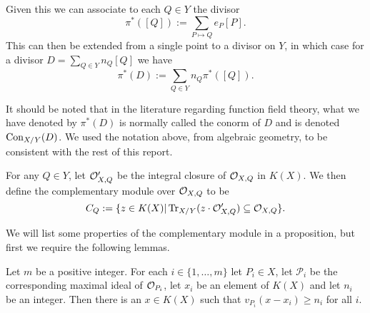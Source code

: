 Given this we can associate to each $Q\in Y$ the divisor
    \[
    \pi^*([Q]) := \sum_{P\mapsto Q} e_P [P].
    \]
This can then be extended from a single point to a divisor on $Y$, in which case for a divisor $D = \sum_{Q\in Y}n_Q [Q]$ we have
    \[
    \pi^*(D) := \sum_{Q\in Y}n_Q \pi^*([Q]).
    \]

    \begin{rem}
    It should be noted that in the literature regarding function field theory, what we have denoted by $\pi^*(D)$ is normally called the conorm of $D$ and is denoted ${\rm Con}_{X/Y}(D)$. 
    We used the notation above, from algebraic geometry, to be consistent with the rest of this report.
    \end{rem}

    \begin{defn}
    For any $Q\in Y$, let ${\cal O}_{X,Q}'$ be the integral closure of ${\cal O}_{X,Q}$ in $K(X)$.
    We then define the complementary module over ${\cal O}_{X,Q}$ to be
        \[
        C_Q :=\{z\in K(X) | \operatorname{Tr}_{X/Y}(z\cdot {\cal O}_{X,Q}') \subseteq {\cal O}_{X,Q}\}.
        \]
    \end{defn}


We will list some properties of the complementary module in a proposition, but first we require the following lemmas.

    \begin{lem}\label{approximationlemma}
    Let $m$ be a positive integer. 
    For each $i\in \{1,\ldots, m\}$ let $P_i\in X$, let $\mathcal{P}_i$ be the corresponding maximal ideal of ${\cal O}_{P_i}$, let $x_i$ be an element of $K(X)$ and let $n_i$ be an integer.
    Then there is an $x\in K(X)$ such that $v_{P_i}(x-x_i) \geq n_i$ for all $i$.
    \end{lem}
    
